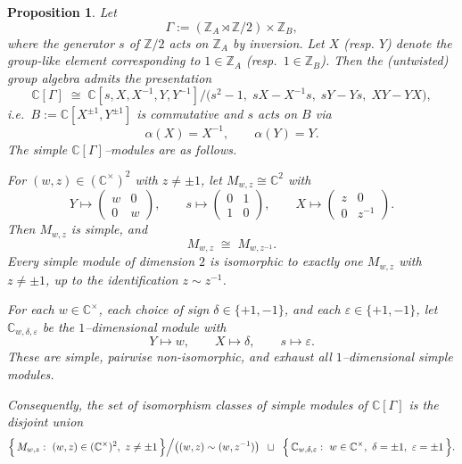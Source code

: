 \documentclass[11pt]{amsart}
\newtheorem{proposition}[theorem]{Proposition}
\theoremstyle{remark}
\theoremstyle{definition}
\newcommand{\Z}{\mathbb{Z}}
\newcommand{\C}{\mathbb{C}}
\begin{document}
\begin{proposition}\label{prop:simples-untwisted}
Let
\[
\Gamma := (\Z_A \rtimes \Z/2)\times \Z_B,
\]
where the generator $s$ of $\Z/2$ acts on $\Z_A$ by inversion.
Let $X$ (resp. $Y$) denote the group-like element corresponding to $1\in \Z_A$
(resp.\ $1\in \Z_B$). Then the (untwisted) group algebra admits the presentation
\[
\C[\Gamma]\;\cong\;
\C[s,X,X^{-1},Y,Y^{-1}]\Big/\bigl(s^2-1,\; sX-X^{-1}s,\; sY-Ys,\; XY-YX\bigr),
\]
i.e.\ $B:=\C[X^{\pm1},Y^{\pm1}]$ is commutative and $s$ acts on $B$ via
\[
\alpha(X)=X^{-1},\qquad \alpha(Y)=Y.
\]
The simple $\C[\Gamma]$--modules are as follows.

\smallskip\noindent
For $(w,z)\in (\C^\times)^2$ with $z\neq \pm 1$, let $M_{w,z}\cong \C^2$ with
\[
Y\mapsto\begin{pmatrix} w&0\\0&w\end{pmatrix},\qquad
s\mapsto\begin{pmatrix}0&1\\1&0\end{pmatrix},\qquad
X\mapsto\begin{pmatrix} z&0\\0&z^{-1}\end{pmatrix}.
\]
Then $M_{w,z}$ is simple, and
\[
M_{w,z}\;\cong\; M_{w,z^{-1}}.
\]
Every simple module of dimension $2$ is isomorphic to exactly one $M_{w,z}$ with $z\neq \pm1$,
up to the identification $z\sim z^{-1}$.

\smallskip\noindent
For each $w\in \C^\times$, each choice of sign $\delta\in\{+1,-1\}$, and each
$\varepsilon\in\{+1,-1\}$, let $\C_{w,\delta,\varepsilon}$ be the $1$--dimensional module with
\[
Y\mapsto w,\qquad X\mapsto \delta,\qquad s\mapsto \varepsilon.
\]
These are simple, pairwise non-isomorphic, and \emph{exhaust} all $1$--dimensional simple modules.

\smallskip
Consequently, the set of isomorphism classes of simple modules of $\C[\Gamma]$ is the disjoint union
\[
\Bigl\{\,M_{w,z}:\ (w,z)\in(\C^\times)^2,\ z\neq\pm 1\,\Bigr\}\Big/\bigl((w,z)\sim(w,z^{-1})\bigr)
\;\;\sqcup\;\;
\Bigl\{\,\C_{w,\delta,\varepsilon}:\ w\in\C^\times,\ \delta=\pm1,\ \varepsilon=\pm1\,\Bigr\}.
\]
\end{proposition}
\end{document}
